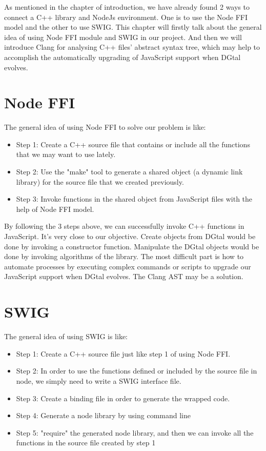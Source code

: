 \label{chap:Proposals}

As mentioned in the chapter of introduction, we have already found 2 ways to connect a C++ library and NodeJs environment. One is to use the Node FFI model and the other to use SWIG. This chapter will firstly talk about the general idea of using Node FFI module and SWIG in our project. And then we will introduce Clang for analysing C++ files' abstract syntax tree, which may help to accomplish the automatically upgrading of JavaScript support when DGtal evolves. 

\section{Node FFI}

The general idea of using Node FFI to solve our problem is like:
\begin{itemize}
   \item Step 1: Create a C++ source file that contains or include all the functions that we may want to use lately.
   \item Step 2: Use the "make" tool to generate a shared object (a dynamic link library) for the source file that we created previously.
   \item Step 3: Invoke functions in the shared object from JavaScript files with the help of Node FFI model. \newline
\end{itemize}

By following the 3 steps above, we can successfully invoke C++ functions in JavaScript. It's very close to our objective. Create objects from DGtal would be done by invoking a constructor function. Manipulate the DGtal objects would be done by invoking algorithms of the library. The most difficult part is how to automate processes by executing complex commands or scripts to upgrade our JavaScript support when DGtal evolves. The Clang AST may be a solution. 


\section{SWIG}
The general idea of using SWIG is like:
    \begin{itemize}
       \item Step 1: Create a C++ source file just like step 1 of using Node FFI.
       \item Step 2: In order to use the functions defined or included by the source file in node, we simply need to write a SWIG interface file.
       \item Step 3: Create a binding file in order to generate the wrapped code.
       \item Step 4: Generate a node library by using command line
       \item Step 5: "require" the generated node library, and then we can invoke all the functions in the source file created by step 1 \newline
    \end{itemize}
    
